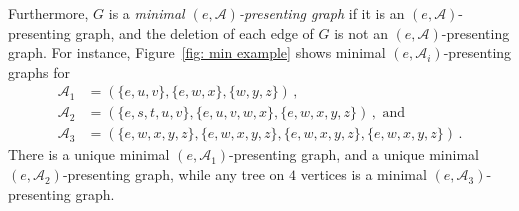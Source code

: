 \documentclass[11pt, reqno]{amsart}
\begin{document}
Furthermore, $G$ is a \emph{minimal $(e, \mathcal A)$-presenting graph} if it is an $(e, \mathcal A)$-presenting graph, and the deletion of each edge of $G$ is not an $(e, \mathcal A)$-presenting graph. For instance, Figure~\ref{fig: min example} shows minimal $(e, \mathcal A_i)$-presenting graphs for
\begin{align*}
\mathcal A_1 &= (\{e,u,v\},\{e,w,x\},\{w,y,z\}) \,, \\
\mathcal A_2 &= (\{e,s,t,u,v\},\{e,u,v,w,x\},\{e,w,x,y,z\}) \,, \text{ and} \\
\mathcal A_3 &= (\{e,w,x,y,z\},\{e,w,x,y,z\},\{e,w,x,y,z\},\{e,w,x,y,z\}) \,.
\end{align*}
There is a unique minimal $(e, \mathcal A_1)$-presenting graph, and a unique minimal $(e, \mathcal A_2)$-presenting graph, while any tree on $4$ vertices is a minimal $(e, \mathcal A_3)$-presenting graph.
\end{document}
